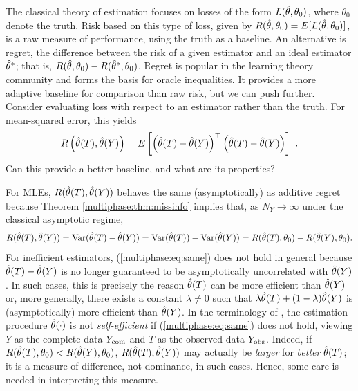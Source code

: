 The classical theory of estimation focuses on losses of the form $L(\hat{\theta}, \theta_0)$, where $\theta_0$ denote the truth.
Risk based on this type of loss, given by $R(\hat{\theta}, \theta_0) = E[L(\hat{\theta}, \theta_0)]$, is a raw measure of performance, using the truth as a baseline.
An alternative is regret, the difference between the risk of a given estimator and an ideal estimator $\hat{\theta}^*$; that is, $R(\hat{\theta}, \theta_0) - R(\hat{\theta}^*, \theta_0)$.
Regret is popular in the learning theory community and forms the basis for oracle inequalities.
It provides a more adaptive baseline for comparison than raw risk, but we can push further.
Consider evaluating loss with respect to an estimator rather than the truth.
For mean-squared error, this yields 
\begin{equation}\label{multiphase:eq:risk}
R\left(\est(T), \est(Y)\right)=E\left[\left(\est(T) - \est(Y)\right)^{\top} \left(\est(T) - \est(Y)\right)\right]\ .
\end{equation}
Can this provide a better baseline, and what are its properties?

For MLEs, $R(\hat{\theta}(T), \hat{\theta}(Y))$ behaves the same (asymptotically) as additive regret because Theorem \ref{multiphase:thm:missinfo} implies that, as $N_Y \rightarrow \infty$ under the classical asymptotic regime,
\begin{equation}\label{multiphase:eq:same}
R(\est(T), \est(Y))=\Var(\est(T) - \est(Y))=\Var(\est(T)) -\Var(\est(Y))
=R(\est(T), \param_0)-R(\est(Y), \param_0)  .
\end{equation}
For inefficient estimators, (\ref{multiphase:eq:same}) does not hold in general because $\hat{\theta}(T) - \hat{\theta}(Y)$ is no longer guaranteed to be asymptotically uncorrelated with $\hat{\theta}(Y)$.
In such cases, this is precisely the reason $\hat{\theta}(T)$ can be more efficient than $\hat{\theta}(Y)$ or, more generally, there exists a constant $\lambda\not=0$ such that  $\lambda\hat{\theta}(T)+(1-\lambda)\hat{\theta}(Y)$ is (asymptotically) more efficient than $\hat{\theta}(Y)$.
In the terminology of \citet{Meng1994}, the estimation procedure $\hat{\theta}(\cdot)$  is not \textit{self-efficient}  if (\ref{multiphase:eq:same}) does not hold, viewing $Y$ as the complete data $Y_{\rm com}$ and $T$ as the observed data $Y_{\rm obs}$.
%
Indeed, if $R(\hat{\theta}(T), \theta_0) < R(\hat{\theta}(Y), \theta_0)$, $R(\hat{\theta}(T), \hat{\theta}(Y))$ may actually be \emph{larger} for \emph{better} $\hat{\theta}(T)$; it is a measure of difference, not dominance, in such cases.
Hence, some care is needed in interpreting this measure.
 

